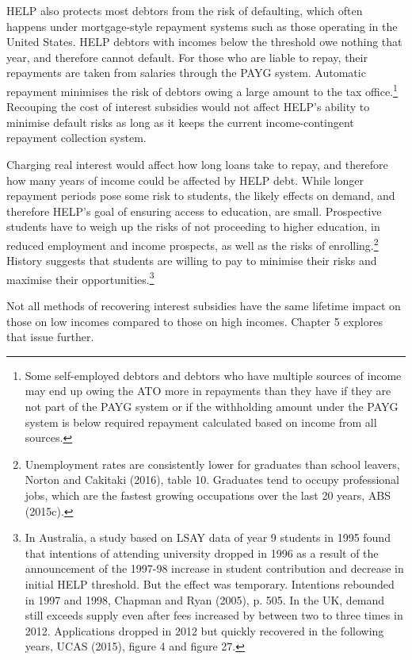 \documentclass[embargoed]{grattan}
\begin{document}
HELP also protects most debtors from the risk of defaulting, which often happens under mortgage-style repayment systems such as those operating in the United States. HELP debtors with incomes below the threshold owe nothing that year, and therefore cannot default. For those who are liable to repay, their repayments are taken from salaries through the PAYG system. Automatic repayment minimises the risk of debtors owing a large amount to the tax office.\footnote{Some self-employed debtors and debtors who have multiple sources of income may end up owing the ATO more in repayments than they have if they are not part of the PAYG system or if the withholding amount under the PAYG system is below required repayment calculated based on income from all sources.} Recouping the cost of interest subsidies would not affect HELP's ability to minimise default risks as long as it keeps the current income-contingent repayment collection system.

Charging real interest would affect how long loans take to repay, and therefore how many years of income could be affected by HELP debt. While longer repayment periods pose some risk to students, the likely effects on demand, and therefore HELP's goal of ensuring access to education, are small. Prospective students have to weigh up the risks of not proceeding to higher education, in reduced employment and income prospects, as well as the risks of enrolling.\footnote{Unemployment rates are consistently lower for graduates than school leavers, Norton and Cakitaki (2016), table 10. Graduates tend to occupy professional jobs, which are the fastest growing occupations over the last 20 years, ABS (2015c).} History suggests that students are willing to pay to minimise their risks and maximise their opportunities.\footnote{In Australia, a study based on LSAY data of year 9 students in 1995 found that intentions of attending university dropped in 1996 as a result of the announcement of the 1997-98 increase in student contribution and decrease in initial HELP threshold. But the effect was temporary. Intentions rebounded in 1997 and 1998, Chapman and Ryan (2005), p. 505. In the UK, demand still exceeds supply even after fees increased by between two to three times in 2012. Applications dropped in 2012 but quickly recovered in the following years, UCAS (2015), figure 4 and figure 27.}

Not all methods of recovering interest subsidies have the same lifetime impact on those on low incomes compared to those on high incomes. Chapter 5 explores that issue further.
\end{document}

